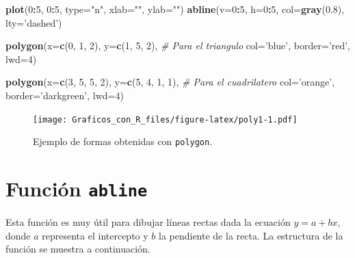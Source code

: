 \documentclass[10pt,]{krantz}
\makeatletter
\newenvironment{Shaded}{\begin{snugshade}}{\end{snugshade}}
\newcommand{\KeywordTok}[1]{\textcolor[rgb]{0.13,0.29,0.53}{\textbf{#1}}}
\newcommand{\DataTypeTok}[1]{\textcolor[rgb]{0.13,0.29,0.53}{#1}}
\newcommand{\DecValTok}[1]{\textcolor[rgb]{0.00,0.00,0.81}{#1}}
\newcommand{\FloatTok}[1]{\textcolor[rgb]{0.00,0.00,0.81}{#1}}
\newcommand{\StringTok}[1]{\textcolor[rgb]{0.31,0.60,0.02}{#1}}
\newcommand{\CommentTok}[1]{\textcolor[rgb]{0.56,0.35,0.01}{\textit{#1}}}
\newcommand{\OperatorTok}[1]{\textcolor[rgb]{0.81,0.36,0.00}{\textbf{#1}}}
\newcommand{\NormalTok}[1]{#1}
\newenvironment{kframe}{%
\medskip{}
\setlength{\fboxsep}{.8em}
 \def\at@end@of@kframe{}%
 \ifinner\ifhmode%
  \def\at@end@of@kframe{\end{minipage}}%
  \begin{minipage}{\columnwidth}%
 \fi\fi%
 \def\FrameCommand##1{\hskip\@totalleftmargin \hskip-\fboxsep
 \colorbox{shadecolor}{##1}\hskip-\fboxsep
     \hskip-\linewidth \hskip-\@totalleftmargin \hskip\columnwidth}%
 \MakeFramed {\advance\hsize-\width
   \@totalleftmargin\z@ \linewidth\hsize
   \@setminipage}}%
 {\par\unskip\endMakeFramed%
 \at@end@of@kframe}
\renewenvironment{Shaded}{\begin{kframe}}{\end{kframe}}
\makeatother
\begin{document}
\begin{Shaded}
\begin{Highlighting}[]
\KeywordTok{plot}\NormalTok{(}\DecValTok{0}\OperatorTok{:}\DecValTok{5}\NormalTok{, }\DecValTok{0}\OperatorTok{:}\DecValTok{5}\NormalTok{, }\DataTypeTok{type=}\StringTok{"n"}\NormalTok{, }\DataTypeTok{xlab=}\StringTok{""}\NormalTok{, }\DataTypeTok{ylab=}\StringTok{""}\NormalTok{)}
\KeywordTok{abline}\NormalTok{(}\DataTypeTok{v=}\DecValTok{0}\OperatorTok{:}\DecValTok{5}\NormalTok{, }\DataTypeTok{h=}\DecValTok{0}\OperatorTok{:}\DecValTok{5}\NormalTok{, }\DataTypeTok{col=}\KeywordTok{gray}\NormalTok{(}\FloatTok{0.8}\NormalTok{), }\DataTypeTok{lty=}\StringTok{'dashed'}\NormalTok{)}

\KeywordTok{polygon}\NormalTok{(}\DataTypeTok{x=}\KeywordTok{c}\NormalTok{(}\DecValTok{0}\NormalTok{, }\DecValTok{1}\NormalTok{, }\DecValTok{2}\NormalTok{), }\DataTypeTok{y=}\KeywordTok{c}\NormalTok{(}\DecValTok{1}\NormalTok{, }\DecValTok{5}\NormalTok{, }\DecValTok{2}\NormalTok{),         }\CommentTok{# Para el triangulo}
        \DataTypeTok{col=}\StringTok{'blue'}\NormalTok{, }\DataTypeTok{border=}\StringTok{'red'}\NormalTok{, }\DataTypeTok{lwd=}\DecValTok{4}\NormalTok{)}

\KeywordTok{polygon}\NormalTok{(}\DataTypeTok{x=}\KeywordTok{c}\NormalTok{(}\DecValTok{3}\NormalTok{, }\DecValTok{5}\NormalTok{, }\DecValTok{5}\NormalTok{, }\DecValTok{2}\NormalTok{), }\DataTypeTok{y=}\KeywordTok{c}\NormalTok{(}\DecValTok{5}\NormalTok{, }\DecValTok{4}\NormalTok{, }\DecValTok{1}\NormalTok{, }\DecValTok{1}\NormalTok{), }\CommentTok{# Para el cuadrilatero}
        \DataTypeTok{col=}\StringTok{'orange'}\NormalTok{, }\DataTypeTok{border=}\StringTok{'darkgreen'}\NormalTok{, }\DataTypeTok{lwd=}\DecValTok{4}\NormalTok{)}
\end{Highlighting}
\end{Shaded}

\begin{figure}
\centering
\texttt{[image: Graficos\_con\_R\_files/figure-latex/poly1-1.pdf]}
\caption{\label{fig:poly1}Ejemplo de formas obtenidas con \texttt{polygon}.}
\end{figure}

\section{\texorpdfstring{Función \texttt{abline}
}{Función abline }}\label{funcion-abline}

Esta función es muy útil para dibujar líneas rectas dada la ecuación
\(y=a+bx\), donde \(a\) representa el intercepto y \(b\) la pendiente de
la recta. La estructura de la función se muestra a continuación.
\end{document}
